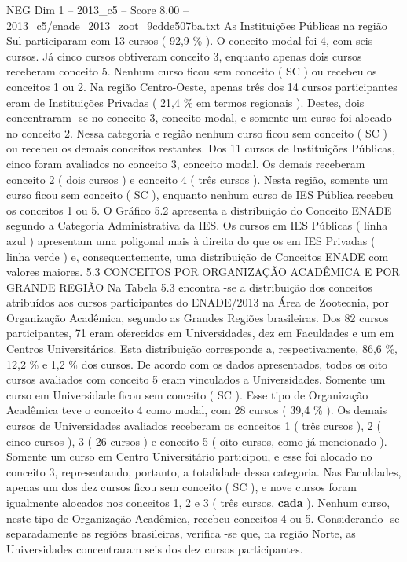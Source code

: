 \begin{textsample}{NEG Dim 1 – 2013\_c5 – Score 8.00 – 2013\_c5/enade\_2013\_zoot\_9cdde507ba.txt}
As Instituições Públicas na região Sul participaram com 13 cursos ( 92,9 \% ).
O conceito modal foi 4, com seis cursos.
Já cinco cursos obtiveram conceito 3, enquanto apenas dois cursos receberam conceito 5.
Nenhum curso ficou sem conceito ( SC ) ou recebeu os conceitos 1 ou 2.
Na região Centro-Oeste, apenas três dos 14 cursos participantes eram de Instituições Privadas ( 21,4 \% em termos regionais ).
Destes, dois concentraram -se no conceito 3, conceito modal, e somente um curso foi alocado no conceito 2.
Nessa categoria e região nenhum curso ficou sem conceito ( SC ) ou recebeu os demais conceitos restantes.
Dos 11 cursos de Instituições Públicas, cinco foram avaliados no conceito 3, conceito modal.
Os demais receberam conceito 2 ( dois cursos ) e conceito 4 ( três cursos ).
Nesta região, somente um curso ficou sem conceito ( SC ), enquanto nenhum curso de IES Pública recebeu os conceitos 1 ou 5.
O Gráfico 5.2 apresenta a distribuição do Conceito ENADE segundo a Categoria Administrativa da IES.
Os cursos em IES Públicas ( linha azul ) apresentam uma poligonal mais à direita do que os em IES Privadas ( linha verde ) e, consequentemente, uma distribuição de Conceitos ENADE com valores maiores. 5.3 CONCEITOS POR ORGANIZAÇÃO ACADÊMICA E POR GRANDE REGIÃO Na Tabela 5.3 encontra -se a distribuição dos conceitos atribuídos aos cursos participantes do ENADE/2013 na Área de Zootecnia, por Organização Acadêmica, segundo as Grandes Regiões brasileiras.
Dos 82 cursos participantes, 71 eram oferecidos em Universidades, dez em Faculdades e um em Centros Universitários.
Esta distribuição corresponde a, respectivamente, 86,6 \%, 12,2 \% e 1,2 \% dos cursos.
De acordo com os dados apresentados, todos os oito cursos avaliados com conceito 5 eram vinculados a Universidades.
Somente um curso em Universidade ficou sem conceito ( SC ).
Esse tipo de Organização Acadêmica teve o conceito 4 como modal, com 28 cursos ( 39,4 \% ).
Os demais cursos de Universidades avaliados receberam os conceitos 1 ( três cursos ), 2 ( cinco cursos ), 3 ( 26 cursos ) e conceito 5 ( oito cursos, como já mencionado ).
Somente um curso em Centro Universitário participou, e esse foi alocado no conceito 3, representando, portanto, a totalidade dessa categoria.
Nas Faculdades, apenas um dos dez cursos ficou sem conceito ( SC ), e nove cursos foram igualmente alocados nos conceitos 1, 2 e 3 ( três cursos, \textbf{cada} ).
Nenhum curso, neste tipo de Organização Acadêmica, recebeu conceitos 4 ou 5.
Considerando -se separadamente as regiões brasileiras, verifica -se que, na região Norte, as Universidades concentraram seis dos dez cursos participantes.

\end{textsample}
